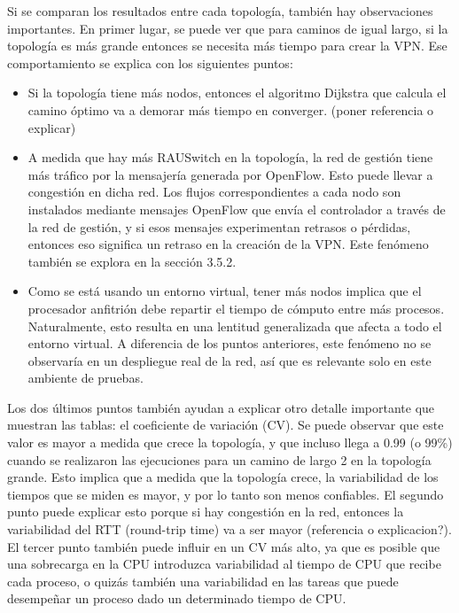 Si se comparan los resultados entre cada topología, también hay observaciones importantes. En primer lugar, se puede ver que para caminos de igual largo, si la topología es más grande entonces se necesita más tiempo para crear la VPN. Ese comportamiento se explica con los siguientes puntos:
\begin{itemize}
	\item Si la topología tiene más nodos, entonces el algoritmo Dijkstra que calcula el camino óptimo va a demorar más tiempo en converger. (poner referencia o explicar)
	\item A medida que hay más RAUSwitch en la topología, la red de gestión tiene más tráfico por la mensajería generada por OpenFlow. Esto puede llevar a congestión en dicha red. Los flujos correspondientes a cada nodo son instalados mediante mensajes OpenFlow que envía el controlador a través de la red de gestión, y si esos mensajes experimentan retrasos o pérdidas, entonces eso significa un retraso en la creación de la VPN. Este fenómeno también se explora en la sección 3.5.2.
	\item Como se está usando un entorno virtual, tener más nodos implica que el procesador anfitrión debe repartir el tiempo de cómputo entre más procesos. Naturalmente, esto resulta en una lentitud generalizada que afecta a todo el entorno virtual. A diferencia de los puntos anteriores, este fenómeno no se observaría en un despliegue real de la red, así que es relevante solo en este ambiente de pruebas.
\end{itemize}
Los dos últimos puntos también ayudan a explicar otro detalle importante que muestran las tablas: el coeficiente de variación (CV). Se puede observar que este valor es mayor a medida que crece la topología, y que incluso llega a 0.99 (o 99\%) cuando se realizaron las ejecuciones para un camino de largo 2 en la topología grande. Esto implica que a medida que la topología crece, la variabilidad de los tiempos que se miden es mayor, y por lo tanto son menos confiables.
El segundo punto puede explicar esto porque si hay congestión en la red, entonces la variabilidad del RTT (round-trip time) va a ser mayor (referencia o explicacion?). El tercer punto también puede influir en un CV más alto, ya que es posible que una sobrecarga en la CPU introduzca variabilidad al tiempo de CPU que recibe cada proceso, o quizás también una variabilidad en las tareas que puede desempeñar un proceso dado un determinado tiempo de CPU. \\

